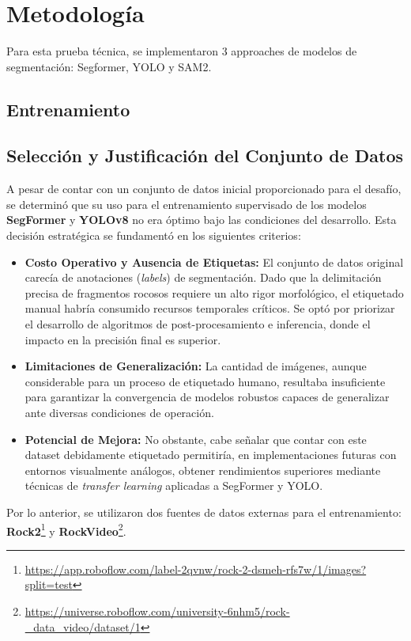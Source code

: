 \section{Metodología}
Para esta prueba técnica, se implementaron 3 approaches de modelos de segmentación: Segformer, YOLO y SAM2.

\subsection{Entrenamiento}

\subsection{Selección y Justificación del Conjunto de Datos}

A pesar de contar con un conjunto de datos inicial proporcionado para el desafío, se determinó que su uso para el entrenamiento supervisado de los modelos \textbf{SegFormer} y \textbf{YOLOv8} no era óptimo bajo las condiciones del desarrollo. Esta decisión estratégica se fundamentó en los siguientes criterios:

\begin{itemize}
	\item \textbf{Costo Operativo y Ausencia de Etiquetas:} El conjunto de datos original carecía de anotaciones (\textit{labels}) de segmentación. Dado que la delimitación precisa de fragmentos rocosos requiere un alto rigor morfológico, el etiquetado manual habría consumido recursos temporales críticos. Se optó por priorizar el desarrollo de algoritmos de post-procesamiento e inferencia, donde el impacto en la precisión final es superior.
	\item \textbf{Limitaciones de Generalización:} La cantidad de imágenes, aunque considerable para un proceso de etiquetado humano, resultaba insuficiente para garantizar la convergencia de modelos robustos capaces de generalizar ante diversas condiciones de operación.
	\item \textbf{Potencial de Mejora:} No obstante, cabe señalar que contar con este dataset debidamente etiquetado permitiría, en implementaciones futuras con entornos visualmente análogos, obtener rendimientos superiores mediante técnicas de \textit{transfer learning} aplicadas a SegFormer y YOLO.
\end{itemize}

Por lo anterior, se utilizaron dos fuentes de datos externas para el entrenamiento: \textbf{Rock2}\footnote{\url{https://app.roboflow.com/label-2qvnw/rock-2-dsmeh-rfs7w/1/images?split=test}} y \textbf{RockVideo}\footnote{\url{https://universe.roboflow.com/university-6nhm5/rock-_data_video/dataset/1}}.

